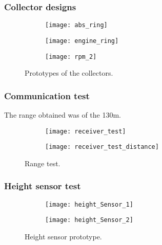 \documentclass{beamer}
\begin{document}
	\begin{frame}
		\frametitle{Collector designs}
		\begin{figure}
			\centering
			\begin{subfigure}[b]{0.3\textwidth}
				\centering
				\texttt{[image: abs\_ring]}
			\end{subfigure}
			\hfill
			\begin{subfigure}[b]{0.3\textwidth}
				\centering
				\texttt{[image: engine\_ring]}
			\end{subfigure}
			\hfill
			\begin{subfigure}[b]{0.3\textwidth}
				\centering
				\texttt{[image: rpm\_2]}
			\end{subfigure}
			\caption{Prototypes of the collectors.}
			\label{fig:rings}
		\end{figure}
	\end{frame}

	\begin{frame}
		\frametitle{Communication test}
		The range obtained was of the 130m.
		\begin{figure}
			\centering
			\begin{subfigure}[b]{0.2\textwidth}
				\centering
				\texttt{[image: receiver\_test]}
			\end{subfigure}
			\hfill
			\begin{subfigure}[b]{0.7\textwidth}
				\centering
				\texttt{[image: receiver\_test\_distance]}
			\end{subfigure}
			\caption{Range test.}
			\label{fig:range}
		\end{figure}
	\end{frame}

	\begin{frame}
		\frametitle{Height sensor test}
		\begin{figure}
			\centering
			\begin{subfigure}[b]{0.48\textwidth}
				\centering
				\texttt{[image: height\_Sensor\_1]}
			\end{subfigure}
			\hfill
			\begin{subfigure}[b]{0.48\textwidth}
				\centering
				\texttt{[image: height\_Sensor\_2]}
			\end{subfigure}
			\caption{Height sensor prototype.}
			\label{fig:height}
		\end{figure}
	\end{frame}
\end{document}
